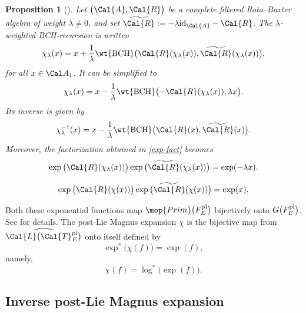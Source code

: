 \documentclass[10pt,a4paper]{article}
\numberwithin{equation}{section}
\newtheorem{Proposition}[Theorem]{Proposition}
 { \theoremstyle{definition}
\newtheorem{Definition}[Theorem]{Definition}
\newtheorem{Note}[Theorem]{Note}
\newtheorem{Example}[Theorem]{Example}
\newtheorem{Remark}[Theorem]{Remark} }
\begin{document}
\begin{Proposition}[{\cite[Proposition 11]{KLM06}}]
Let $\big(\Cal{A}, \Cal{R}\big)$ be a complete filtered Rota--Baxter algebra of weight $\lambda\neq 0$, and set $\widetilde{\Cal{R}} := -\lambda {\rm id}_{\Cal{A}}- \Cal{R}$. The $\lambda$-weighted BCH-recursion is written
\begin{equation}
\label{chi-lambda-rec}
\chi_{\lambda}(x)
= x + \frac{1}{\lambda} \wt{{\rm BCH}}\big(\Cal{R}(\chi_{\lambda}(x)),
\widetilde{\Cal{R}}(\chi_{\lambda}(x))\big),
\end{equation}
for all $x\in\Cal A_1$. It can be simplified to
\begin{equation*}
\chi_{\lambda}(x)
= x - \frac{1}{\lambda} \wt{{\rm BCH}}\big({-}\Cal{R}(\chi_{\lambda}(x)), \lambda x\big).
\end{equation*}
Its inverse is given by
\begin{equation*}
\chi_{\lambda}^{-1}(x)
= x - \frac{1}{\lambda} \wt{{\rm BCH}}\big(\Cal{R}(x), \widetilde{\Cal{R}}(x)\big).
\end{equation*}
Moreover, the factorization obtained in \eqref{exp-fact} becomes
\begin{equation}
\label{exp-moins-lambda-x}
\exp\big(\Cal{R}(\chi_{\lambda}(x))\big)\exp\big(\widetilde{\Cal{R}}
(\chi_{\lambda}(x))\big) = \exp(-\lambda x).
\end{equation}
\end{Proposition}

\begin{equation}\label{exp-fact}
\exp\big(\Cal{R}(\chi(x))\big)\exp\big(\widetilde{\Cal{R}}(\chi(x))\big) = \exp(x),
\end{equation}

Both these exponential functions map $\mop{Prim}\big(F^{\rm pl}_E\big)$ bijectively onto $G\big(F^{\rm pl}_E\big)$. See \cite{ELM2015} for details. The post-Lie Magnus expansion $\chi$ is the bijective map from $\widehat{\Cal{L}\big(\Cal{T}^{\rm pl}_E\big)}$ onto itself defined by
\begin{displaymath}
\exp^{*}\big(\chi(f)\big) = \exp(f),
\end{displaymath}
namely,
\begin{equation}
\label{pl-Magnus}
\chi(f) = \log^{\ast}\big(\exp(f)\big).
\end{equation}

\subsection{Inverse post-Lie Magnus expansion}
\end{document}
